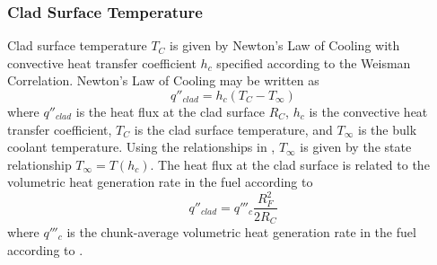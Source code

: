     \subsubsection{Clad Surface Temperature}
      Clad surface temperature $T_C$ is given by Newton's Law of Cooling with
      convective heat transfer coefficient $h_c$ specified according to the
      Weisman Correlation. Newton's Law of Cooling may be written as
      \begin{equation}
        q''_{clad} = h_c (T_C - T_{\infty})
      \end{equation}
      where $q''_{clad}$ is the heat flux at the clad surface $R_C$, $h_c$ is
      the convective heat transfer coefficient, $T_C$ is the clad surface
      temperature, and $T_{\infty}$ is the bulk coolant temperature. Using the
      relationships in , $T_{\infty}$ is given
      by the state relationship $T_{\infty} = T(h_c)$. The heat flux at the clad
      surface is related to the volumetric heat generation rate in the fuel
      according to 
      \begin{equation}
        q''_{clad} = q'''_c \frac{R_F^2}{2 R_C}
      \end{equation}
      where $q'''_c$ is the chunk-average volumetric heat generation rate in the
      fuel according to .

